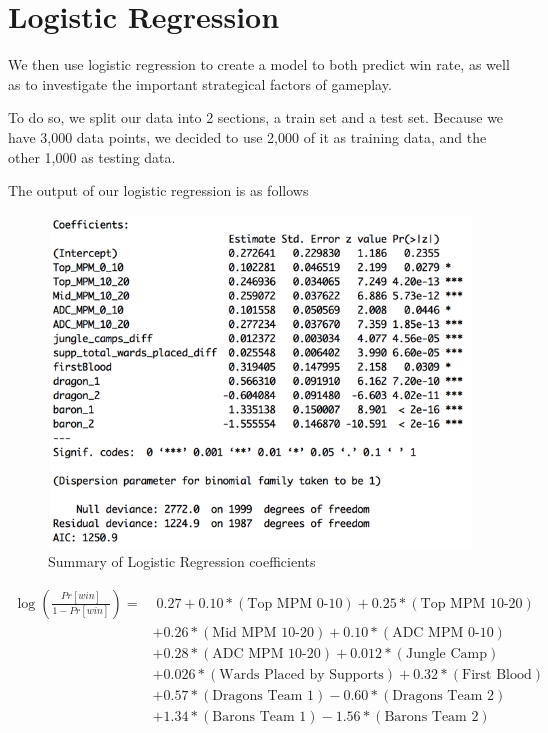 \documentclass[runningheads]{llncs}
\begin{document}
	\section{Logistic Regression}
	
	We then use logistic regression to create a model to both predict win rate, as well as to investigate the important strategical factors of gameplay.
	
	To do so, we split our data into 2 sections, a train set and a test set. Because we have 3,000 data points, we decided to use 2,000 of it as training data, and the other 1,000 as testing data.

	The output of our logistic regression is as follows

	\begin{figure}[!htb]
		\centering
		\includegraphics[width=\textwidth]{images/lr_summary.png}
		\caption{Summary of Logistic Regression coefficients}
	\end{figure}
	
	\begin{align*}
	\log \left( \frac{Pr[win]}{1 - Pr[win]} \right) =&\; 0.27 + 0.10 * (\text{Top MPM 0-10}) + 0.25 * (\text{Top MPM 10-20}) \\
	& + 0.26 * (\text{Mid MPM 10-20}) + 0.10 * (\text{ADC MPM 0-10}) \\
	& + 0.28 * (\text{ADC MPM 10-20}) + 0.012 * (\text{Jungle Camp}) \\
	& + 0.026 * (\text{Wards Placed by Supports}) + 0.32 * (\text{First Blood}) \\
	& + 0.57 * (\text{Dragons Team 1}) - 0.60 * (\text{Dragons Team 2}) \\
	& + 1.34 * (\text{Barons Team 1}) - 1.56 * (\text{Barons Team 2})
	\end{align*}
	
\end{document}
